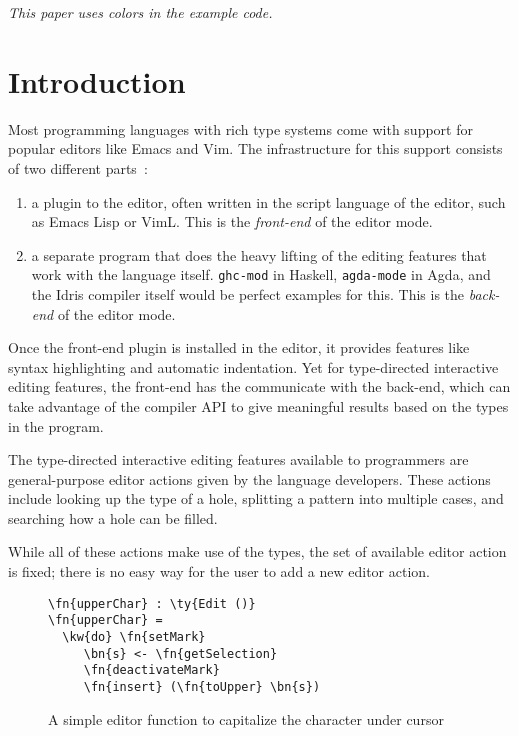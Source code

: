 \documentclass[sigplan, authordraft]{acmart}
\newcommand\fakeslant[1]{%
  \special{pdf: literal 1 0 0.167 1 0 0 cm}#1\special{pdf: literal 1 0 -0.167 1 0 0 cm}}
\newcommand{\IdrisType}[1]{\textcolor{IdrisBlue}{#1}}
\newcommand{\IdrisBound}[1]{\textcolor{IdrisLilac}{\fakeslant{#1}}}
\newcommand{\IdrisFunction}[1]{\textcolor{IdrisGreen}{#1}}
\newcommand{\IdrisKeyword}[1]{{\textbf{#1}}}
\newcommand{\ty}[1]{\IdrisType{\texttt{#1}}}
\newcommand{\kw}[1]{\IdrisKeyword{\texttt{#1}}}
\newcommand{\fn}[1]{\IdrisFunction{\texttt{#1}}}
\newcommand{\bn}[1]{\IdrisBound{\texttt{#1}}}
\newcommand{\mt}[1]{\mbox{\texttt{#1}}}
\newcommand{\TODO}[1]{{\color{red}{[TODO: #1]}}}
\begin{document}
\maketitle

\emph{This paper uses colors in the example code.}

\section{Introduction}

Most programming languages with rich type systems come with support for popular
editors like Emacs and Vim. The infrastructure for this support consists of
two different parts~\cite{editTimeTactics}:

\begin{enumerate}
  \item a plugin to the editor, often written in the script language of the
    editor, such as Emacs Lisp or VimL. This is the \emph{front-end} of the
    editor mode.
  \item a separate program that does the heavy lifting of the editing features
    that work with the language itself.  \mt{ghc-mod} in Haskell,
    \mt{agda-mode} in Agda, and the Idris compiler itself would be perfect
    examples for this. This is the \emph{back-end} of the editor mode.
\end{enumerate}

Once the front-end plugin is installed in the editor, it provides features like
syntax highlighting and automatic indentation. Yet for type-directed
interactive editing features, the front-end has the communicate with the
back-end, which can take advantage of the compiler API to give meaningful
results based on the types in the program.

The type-directed interactive editing features available to programmers are
general-purpose editor actions given by the language developers. These actions
include looking up the type of a hole, splitting a pattern into multiple
cases, and searching how a hole can be filled.

While all of these actions make use of the types, the set of available editor
action is fixed; there is no easy way for the user to add a new editor action.
\TODO{the whole spiel about how my work makes it possible to add a new editor
action in Idris itself}

\begin{figure}[H]
\begin{Verbatim}
\fn{upperChar} : \ty{Edit ()}
\fn{upperChar} =
  \kw{do} \fn{setMark}
     \bn{s} <- \fn{getSelection}
     \fn{deactivateMark}
     \fn{insert} (\fn{toUpper} \bn{s})
\end{Verbatim}
\caption{A simple editor function to capitalize the character under cursor}
\label{fig:upperChar}
\end{figure}
\end{document}

